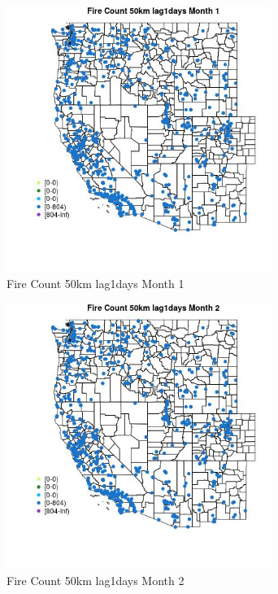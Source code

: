 \begin{figure} 
\centering  
\includegraphics[width=0.77\textwidth]{Code_Outputs/Report_ML_input_PM25_Step4_part_f_de_duplicated_aveswNAs_MapObsMo1Fire_Count_50km_lag1days.jpg} 
\caption{\label{fig:Report_ML_input_PM25_Step4_part_f_de_duplicated_aveswNAsMapObsMo1Fire_Count_50km_lag1days}Fire Count 50km lag1days Month 1} 
\end{figure} 
 

\begin{figure} 
\centering  
\includegraphics[width=0.77\textwidth]{Code_Outputs/Report_ML_input_PM25_Step4_part_f_de_duplicated_aveswNAs_MapObsMo2Fire_Count_50km_lag1days.jpg} 
\caption{\label{fig:Report_ML_input_PM25_Step4_part_f_de_duplicated_aveswNAsMapObsMo2Fire_Count_50km_lag1days}Fire Count 50km lag1days Month 2} 
\end{figure} 
 

